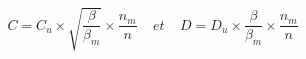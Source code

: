 \begin{equation}
C=C_u\times \sqrt{\frac{\beta}{\beta_m}}\times \frac{n_m}{n} \ \ \ \ \ et \ \ \ \ \ D=D_u\times \frac{\beta}{\beta_m} \times \frac{n_m}{n}
\end{equation}
